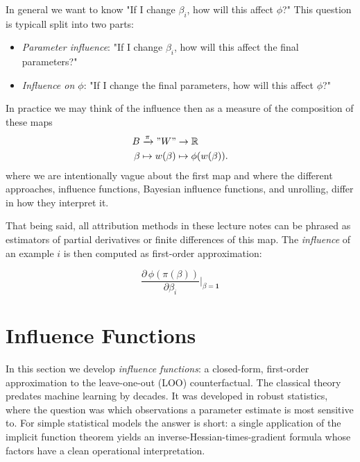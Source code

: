 \documentclass[11pt]{article}
\begin{document}
In general we want to know "If I change $\beta_i$, how will this affect $\phi$?" This question is typicall split into two parts:
\begin{itemize}
  \item \emph{Parameter influence}: "If I change $\beta_i$, how will this affect the final parameters?"
  \item \emph{Influence on $\phi$}: "If I change the final parameters, how will this affect $\phi$?"
\end{itemize}
In practice we may think of the influence then as a measure of the composition of these maps
\begin{align}\label{eq:holy-maps}
  B &\xrightarrow{\pi} "W"\to \mathbb{R} \\
  \beta &\mapsto w(\beta) \mapsto \phi(w(\beta)).
\end{align}
where we are intentionally vague about the first map and where the different approaches, influence functions, Bayesian influence functions, and unrolling, differ in how they interpret it.

That being said, all attribution methods in these lecture notes can be phrased as estimators of partial derivatives or finite differences of this map. The \emph{influence} of an example $i$ is then computed as first-order approximation:

\begin{equation}\label{eq:holy-grail}
  \boxed{\;\frac{\partial\,\phi(\pi(\beta))}{\partial \beta_i}\bigg|_{\beta = \mathbf{1}}\;}
\end{equation}




\section{Influence Functions}\label{sec:influence}

In this section we develop \emph{influence functions}: a closed-form, first-order approximation to the leave-one-out (LOO) counterfactual. The classical theory \citep{hampel1974,cook1977} predates machine learning by decades. It was developed in robust statistics, where the question was which observations a parameter estimate is most sensitive to. For simple statistical models the answer is short: a single application of the implicit function theorem yields an inverse-Hessian-times-gradient formula whose factors have a clean operational interpretation.
\end{document}

